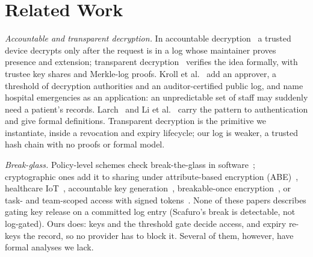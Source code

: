 \section{Related Work}\label{sec:related}



\textit{Accountable and transparent decryption.}
In accountable decryption~\cite{ryan2017accountable} a trusted device decrypts only after the request is in a log whose maintainer proves presence and extension; transparent decryption~\cite{cheval2023transparency} verifies the idea formally, with trustee key shares and Merkle-log proofs.
Kroll et al.~\cite{kroll2018accountable} add an approver, a threshold of decryption authorities and an auditor-certified public log, and name hospital emergencies as an application: an unpredictable set of staff may suddenly need a patient's records.
Larch~\cite{dauterman2023larch} and Li et al.~\cite{li2025accountable} carry the pattern to authentication and give formal definitions.
Transparent decryption is the primitive we instantiate, inside a revocation and expiry lifecycle; our log is weaker, a trusted hash chain with no proofs or formal model.

\textit{Break-glass.}
Policy-level schemes check break-the-glass in software~\cite{ferreira2006break,brucker2009extending,marinovic2011rumpole}; cryptographic ones add it to sharing under attribute-based encryption (ABE)~\cite{brucker2010abe,li2013phr}, healthcare IoT~\cite{yang2018libac}, accountable key generation~\cite{zhang2016password}, breakable-once encryption~\cite{scafuro2019breakglass}, or task- and team-scoped access with signed tokens~\cite{deoliveira2019redalert,deoliveira2020breakglass}.
None of these papers describes gating key release on a committed log entry (Scafuro's break is detectable, not log-gated). Ours does: keys and the threshold gate decide access, and expiry re-keys the record, so no provider has to block it.
Several of them, however, have formal analyses we lack.

